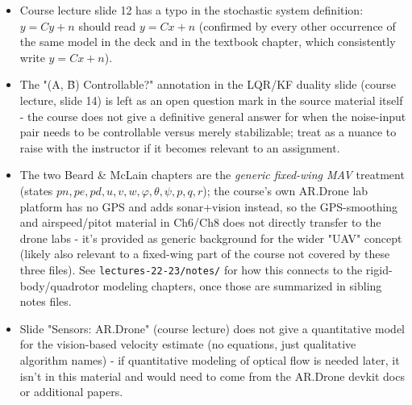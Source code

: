 \documentclass[11pt]{article}
\begin{document}
\begin{itemize}
\item Course lecture slide 12 has a typo in the stochastic system definition: $y = Cy + n$ should read $y = Cx + n$ (confirmed by every other occurrence of the same model in the deck and in the textbook chapter, which consistently write $y=Cx+n$).
\item The "(A, B̄) Controllable?" annotation in the LQR/KF duality slide (course lecture, slide 14) is left as an open question mark in the source material itself - the course does not give a definitive general answer for when the noise-input pair needs to be controllable versus merely stabilizable; treat as a nuance to raise with the instructor if it becomes relevant to an assignment.
\item The two Beard \& McLain chapters are the \textit{generic fixed-wing MAV} treatment (states $pn,pe,pd,u,v,w,φ,θ,ψ,p,q,r$); the course's own AR.Drone lab platform has no GPS and adds sonar+vision instead, so the GPS-smoothing and airspeed/pitot material in Ch6/Ch8 does not directly transfer to the drone labs - it's provided as generic background for the wider "UAV" concept (likely also relevant to a fixed-wing part of the course not covered by these three files). See \texttt{lectures-22-23/notes/} for how this connects to the rigid-body/quadrotor modeling chapters, once those are summarized in sibling notes files.
\item Slide "Sensors: AR.Drone" (course lecture) does not give a quantitative model for the vision-based velocity estimate (no equations, just qualitative algorithm names) - if quantitative modeling of optical flow is needed later, it isn't in this material and would need to come from the AR.Drone devkit docs or additional papers.
\end{itemize}
\end{document}
